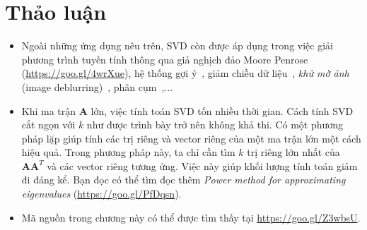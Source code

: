      
 
 
 
 
\section{Thảo luận}

\begin{itemize}
     
    \item Ngoài những ứng dụng nêu trên, SVD còn được áp dụng trong việc giải phương
    trình tuyến tính thông qua giả nghịch đảo Moore Penrose
    (\url{https://goo.gl/4wrXue}), hệ thống gợi ý~\cite{sarwar2000application}, giảm chiều dữ liệu~\cite{cybenko1989approximation}, \textit{khử mờ ảnh} (image deblurring)~\cite{hansen2006deblurring},
    phân cụm~\cite{drineas2004clustering},...
     
    \item Khi ma trận $\mathbf{A}$ lớn, việc tính toán SVD tốn nhiều thời
    gian. Cách tính SVD cắt ngọn với $k$ như được trình bày trở nên không khả thi. Có một phương pháp lặp giúp tính
    các trị riêng và vector riêng của một ma trận lớn một cách hiệu quả. Trong phương pháp này, ta
    chỉ cần tìm $k$ trị riêng lớn nhất của $\mathbf{AA}^T$ và các vector riêng
    tương ứng. Việc này giúp khối lượng tính toán giảm đi đáng kể. Bạn đọc có thể
    tìm đọc thêm \textit{Power method for approximating eigenvalues}
    (\url{https://goo.gl/PfDqsn}). 
    

    \item Mã nguồn trong chương này có thể được tìm thấy tại \url{https://goo.gl/Z3wbsU}.
\end{itemize}
 
 
 
 
